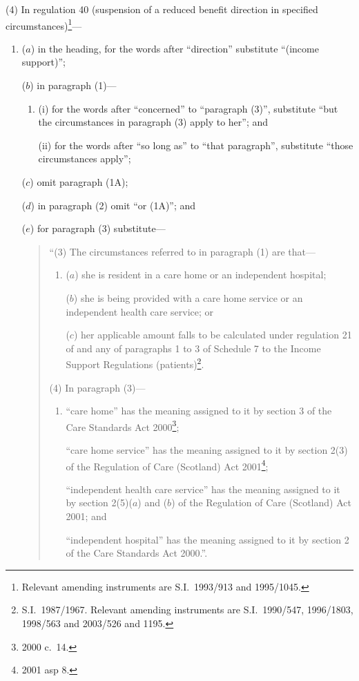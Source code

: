 \documentclass[12pt,a4paper]{article}
\begin{document}
(4) In regulation 40 (suspension of a reduced benefit direction in specified circumstances)\footnote{Relevant amending instruments are S.I.\ 1993/913 and 1995/1045.}—
\begin{enumerate}\item[]
($a$) in the heading, for the words after “direction” substitute “(income support)”;

($b$) in paragraph (1)—
\begin{enumerate}\item[]
(i) for the words after “concerned” to “paragraph (3)”, substitute “but the circumstances in paragraph (3) apply to her”; and

(ii) for the words after “so long as” to “that paragraph”, substitute “those circumstances apply”;
\end{enumerate}

($c$) omit paragraph (1A);

($d$) in paragraph (2) omit “or (1A)”; and

($e$) for paragraph (3) substitute—
\begin{quotation}
“(3) The circumstances referred to in paragraph (1) are that—
\begin{enumerate}\item[]
($a$) she is resident in a care home or an independent hospital;

($b$) she is being provided with a care home service or an independent health care service; or

($c$) her applicable amount falls to be calculated under regulation 21 of and any of paragraphs 1 to 3 of Schedule 7 to the Income Support Regulations (patients)\footnote{S.I.\ 1987/1967. Relevant amending instruments are S.I.\ 1990/547, 1996/1803, 1998/563 and 2003/526 and 1195.}.
\end{enumerate}

(4) In paragraph (3)—
\begin{enumerate}\item[]
“care home” has the meaning assigned to it by section 3 of the Care Standards Act 2000\footnote{2000 c.\ 14.};

“care home service” has the meaning assigned to it by section 2(3) of the Regulation of Care (Scotland) Act 2001\footnote{2001 asp 8.};

“independent health care service” has the meaning assigned to it by section 2(5)($a$)  and ($b$)  of the Regulation of Care (Scotland) Act 2001; and

“independent hospital” has the meaning assigned to it by section 2 of the Care Standards Act 2000.”.
\end{enumerate}
\end{quotation}
\end{enumerate}
\end{document}

